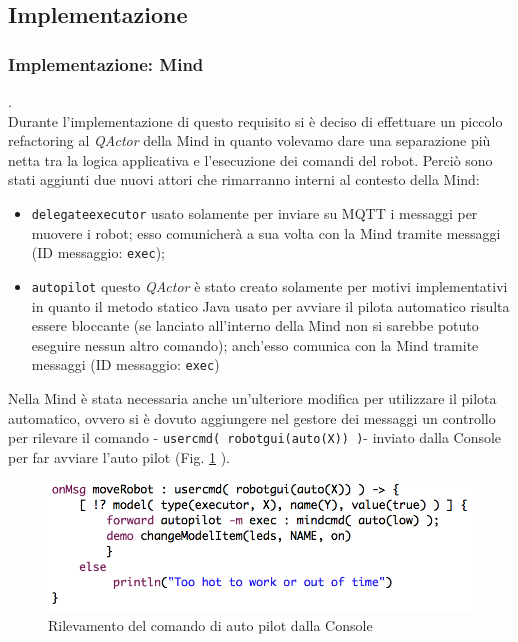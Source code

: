 \documentclass{llncs}
\newcommand{\qa}{\textsf{\textit{QActor }}}
\begin{document}
\pagebreak
\subsection{Implementazione}
\label{ImplementazioneReq5}

\subsubsection{Implementazione: Mind}.
\label{ImplementazioneMindReq5}
\vspace*{1ex}
\\
Durante l'implementazione di questo requisito si \`e deciso di effettuare un piccolo refactoring al \qa della Mind in quanto volevamo dare una separazione pi\`u netta tra la logica applicativa e l'esecuzione dei comandi del robot. Perci\`o sono stati aggiunti due nuovi attori che rimarranno interni al contesto della Mind:
\begin{itemize}
    \item \texttt{delegateexecutor} usato solamente per inviare su MQTT i messaggi per muovere i robot; esso comunicher\`a a sua volta con la Mind tramite messaggi  (ID messaggio: \texttt{exec});
    \item \texttt{autopilot} questo \qa \`e stato creato solamente per motivi implementativi in quanto il metodo statico Java usato per avviare il pilota automatico risulta essere bloccante (se lanciato all'interno della Mind non si sarebbe potuto eseguire nessun altro comando); anch'esso comunica con la Mind tramite messaggi (ID messaggio: \texttt{exec})
\end{itemize}
Nella Mind \`e stata necessaria anche un'ulteriore modifica per utilizzare il pilota automatico, ovvero si \`e dovuto aggiungere nel gestore dei messaggi un controllo per rilevare il comando - \texttt{usercmd( robotgui(auto(X)) )}- inviato dalla Console per far avviare l'auto pilot (Fig. \hyperref[fig:R5AutoPilotMind]{\ref{fig:R5AutoPilotMind}} ). 
\begin{figure}
    \centering
    \includegraphics[width=1\textwidth]{Immagini/Requisito5/AutoPilotMind.png}
    \caption{Rilevamento del comando di auto pilot dalla Console}
    \label{fig:R5AutoPilotMind}
\end{figure}
\pagebreak
\end{document}
